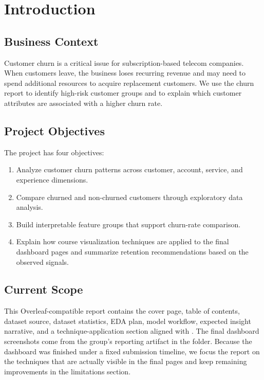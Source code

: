\section{Introduction}

\subsection{Business Context}
Customer churn is a critical issue for subscription-based telecom companies.
When customers leave, the business loses recurring revenue and may need to spend
additional resources to acquire replacement customers. We use the churn report
to identify high-risk customer groups and to explain which customer attributes
are associated with a higher churn rate.

\subsection{Project Objectives}
The project has four objectives:
\begin{enumerate}
  \item Analyze customer churn patterns across customer, account, service, and
  experience dimensions.
  \item Compare churned and non-churned customers through exploratory data
  analysis.
  \item Build interpretable feature groups that support churn-rate comparison.
  \item Explain how course visualization techniques are applied to the final
  dashboard pages and summarize retention recommendations based on the observed
  signals.
\end{enumerate}

\subsection{Current Scope}
This Overleaf-compatible report contains the cover page, table of contents,
dataset source, dataset statistics, EDA plan, model workflow, expected insight
narrative, and a technique-application section aligned with
. The final dashboard screenshots come from the group's
reporting artifact in the  folder. Because the dashboard was finished
under a fixed submission timeline, we focus the report on the techniques that
are actually visible in the final pages and keep remaining improvements in the
limitations section.
